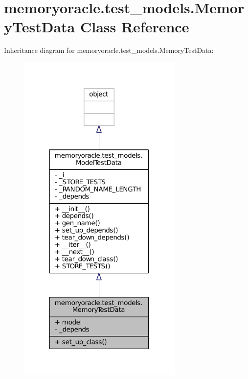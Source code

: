 \hypertarget{classmemoryoracle_1_1test__models_1_1MemoryTestData}{}\section{memoryoracle.\+test\+\_\+models.\+Memory\+Test\+Data Class Reference}
\label{classmemoryoracle_1_1test__models_1_1MemoryTestData}


Inheritance diagram for memoryoracle.\+test\+\_\+models.\+Memory\+Test\+Data\+:\nopagebreak
\begin{figure}[H]
\begin{center}
\leavevmode
\includegraphics[width=232pt]{classmemoryoracle_1_1test__models_1_1MemoryTestData__inherit__graph}
\end{center}
\end{figure}


